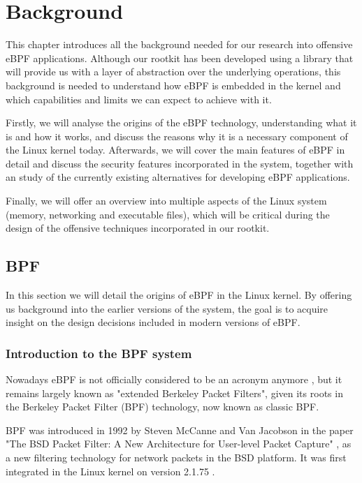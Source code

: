 \chapter{Background}
This chapter introduces all the background needed for our research into offensive eBPF applications. Although our rootkit has been developed using a library that will provide us with a layer of abstraction over the underlying operations, this background is needed to understand how eBPF is embedded in the kernel and which capabilities and limits we can expect to achieve with it.

Firstly, we will analyse the origins of the eBPF technology, understanding what it is and how it works, and discuss the reasons why it is a necessary component of the Linux kernel today. Afterwards, we will cover the main features of eBPF in detail and discuss the security features incorporated in the system, together with an study of the currently existing alternatives for developing eBPF applications.

Finally, we will offer an overview into multiple aspects of the Linux system (memory, networking and executable files), which will be critical during the design of the offensive techniques incorporated in our rootkit.

\section{BPF}
In this section we will detail the origins of eBPF in the Linux kernel. By offering us background into the earlier versions of the system, the goal is to acquire insight on the design decisions included in modern versions of eBPF.

\subsection{Introduction to the BPF system}
Nowadays eBPF is not officially considered to be an acronym anymore \cite{ebpf_io}, but it remains largely known as "extended Berkeley Packet Filters", given its roots in the Berkeley Packet Filter (BPF) technology, now known as classic BPF.

BPF was introduced in 1992 by Steven McCanne and Van Jacobson in the paper "The BSD Packet Filter: A New Architecture for User-level Packet Capture" \cite{bpf_bsd_origin}, as a new filtering technology for network packets in the BSD platform. It was first integrated in the Linux kernel on version 2.1.75 \cite{ebpf_history_opensource}.


